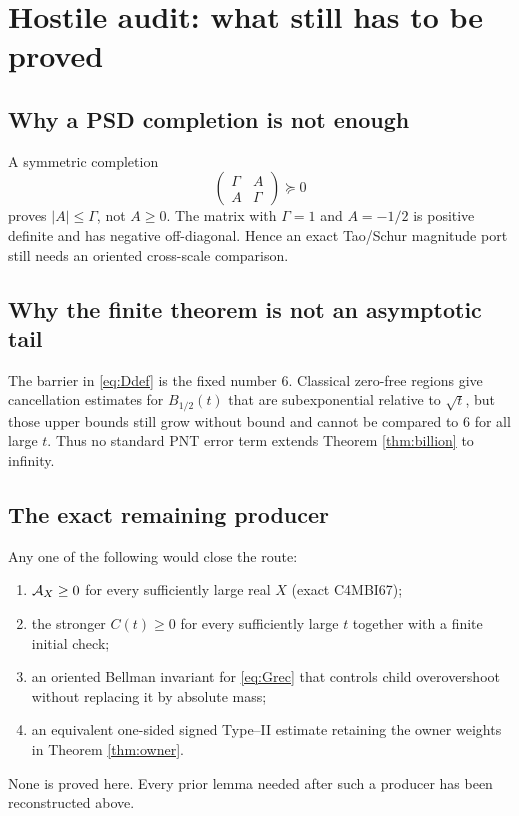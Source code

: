 \section{Hostile audit: what still has to be proved}

\subsection{Why a PSD completion is not enough}
A symmetric completion
\[
 \begin{pmatrix}\Gamma&A\\A&\Gamma\end{pmatrix}\succeq0
\]
proves $|A|\le\Gamma$, not $A\ge0$.  The matrix with $\Gamma=1$ and
$A=-1/2$ is positive definite and has negative off-diagonal.  Hence an exact
Tao/Schur magnitude port still needs an oriented cross-scale comparison.

\subsection{Why the finite theorem is not an asymptotic tail}
The barrier in \eqref{eq:Ddef} is the fixed number $6$.  Classical zero-free
regions give cancellation estimates for $B_{1/2}(t)$ that are subexponential
relative to $\sqrt t$, but those upper bounds still grow without bound and
cannot be compared to $6$ for all large $t$.  Thus no standard PNT error term
extends Theorem \ref{thm:billion} to infinity.

\subsection{The exact remaining producer}
Any one of the following would close the route:
\begin{enumerate}[label=(\roman*)]
\item $\mathcal A_X\ge0$ for every sufficiently large real $X$ (exact C4MBI67);
\item the stronger $C(t)\ge0$ for every sufficiently large $t$ together with a
finite initial check;
\item an oriented Bellman invariant for \eqref{eq:Grec} that controls child
overovershoot without replacing it by absolute mass;
\item an equivalent one-sided signed Type--II estimate retaining the owner
weights in Theorem \ref{thm:owner}.
\end{enumerate}
None is proved here.  Every prior lemma needed after such a producer has been
reconstructed above.

